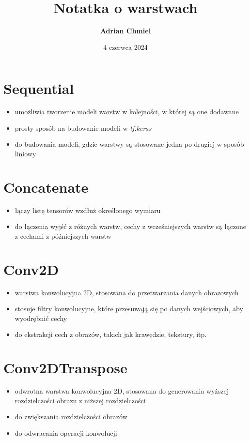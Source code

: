 \documentclass{article}
\begin{document}
\title{\textbf{Notatka o warstwach}}
\author{\textbf{Adrian Chmiel}}
\date{4 czerwca 2024}
\maketitle

\section{Sequential}
\begin{itemize}
    \item umożliwia tworzenie modeli warstw w kolejności, w której są one dodawane
    \item prosty sposób na budowanie modeli w \textit{tf.keras}
    \item do budowania modeli, gdzie warstwy są stosowane jedna po drugiej w sposób liniowy
\end{itemize}

\section{Concatenate}
\begin{itemize}
    \item łączy listę tensorów wzdłuż określonego wymiaru
    \item do łączenia wyjść z różnych warstw, cechy z wcześniejszych warstw są łączone z cechami z późniejszych warstw
\end{itemize}

\section{Conv2D}
\begin{itemize}
    \item warstwa konwolucyjna 2D, stosowana do przetwarzania danych obrazowych
    \item stosuje filtry konwolucyjne, które przesuwają się po danych wejściowych, aby wyodrębnić cechy
    \item do ekstrakcji cech z obrazów, takich jak krawędzie, tekstury, itp.
\end{itemize}

\section{Conv2DTranspose}
\begin{itemize}
    \item odwrotna warstwa konwolucyjna 2D, stosowana do generowania wyższej rozdzielczości obrazu z niższej rozdzielczości
    \item do zwiększania rozdzielczości obrazów
    \item do odwracania operacji konwolucji
\end{itemize}
\end{document}
